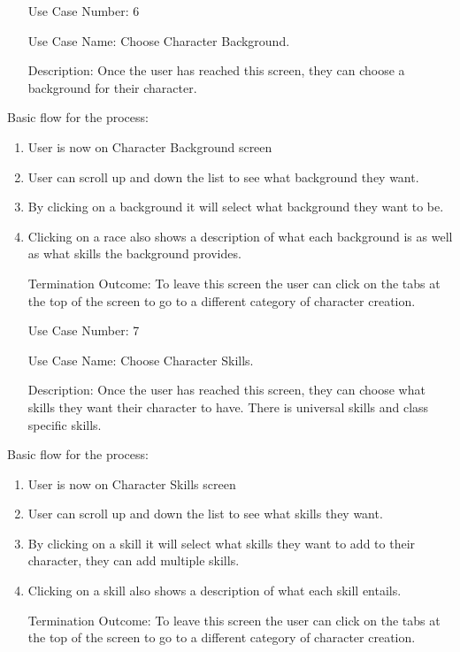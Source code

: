 \documentclass[10pt,conference,onecolumn,compsoc]{IEEEtran}
\begin{document}
\begin{itemize}
\item[Use Case Number:] 6
\item[Use Case Name:] Choose Character Background.
\item[Description:] Once the user has reached this screen, they can choose a background for their character.
\end{itemize}
Basic flow for the process:
\begin{enumerate}
\item User is now on Character Background screen
\item User can scroll up and down the list to see what background they want.
\item By clicking on a background it will select what background they want to be.
\item Clicking on a race also shows a description of what each background is as well as what skills the background provides.
\item[Termination Outcome:] To leave this screen the user can click on the tabs at the top of the screen to go to a different category of character creation.
\end{enumerate}

\begin{itemize}
\item[Use Case Number:] 7
\item[Use Case Name:] Choose Character Skills.
\item[Description:] Once the user has reached this screen, they can choose what skills they want their character to have. There is universal skills and class specific skills.
\end{itemize}
Basic flow for the process:
\begin{enumerate}
\item User is now on Character Skills screen
\item User can scroll up and down the list to see what skills they want.
\item By clicking on a skill it will select what skills they want to add to their character, they can add multiple skills.
\item Clicking on a skill also shows a description of what each skill entails.
\item[Termination Outcome:] To leave this screen the user can click on the tabs at the top of the screen to go to a different category of character creation.
\end{enumerate}
\end{document}
